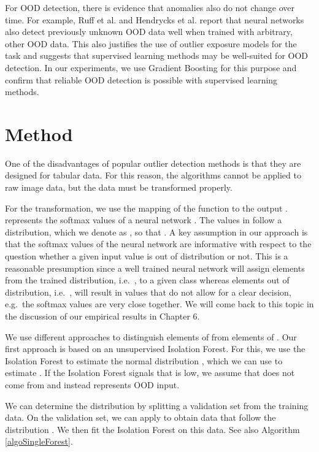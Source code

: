 \documentclass{article}
\begin{document}
For OOD detection, there is evidence that anomalies also do not change over time. For example, Ruff et al. \cite{Ruff.30.05.2020} and Hendrycks et al. \cite{Hendrycks.2018} report that neural networks also detect previously unknown OOD data well when trained with arbitrary, other OOD data. This also justifies the use of outlier exposure models for the task and suggests that supervised learning methods may be well-suited for OOD detection. In our experiments, we use Gradient Boosting \cite{Friedman.2002} for this purpose and confirm that reliable OOD detection is possible with supervised learning methods.


\section{Method}

One of the disadvantages of popular outlier detection methods is that they are designed for tabular data. For this reason, the algorithms cannot be applied to raw image data, but the data must be transformed properly.

For the transformation, we use the mapping of the function  to the output .  represents the softmax values of a neural network . The values in  follow a distribution, which we denote as , so that . A key assumption in our approach is that the softmax values of the neural network are informative with respect to the question whether a given input value is out of distribution or not. This is a reasonable presumption since a well trained neural network will assign elements from the trained distribution, i.e.~, to a given class whereas elements out of distribution, i.e.~, will result in values that do not allow for a clear decision, e.g.~the softmax values are very close together. We will come back to this topic in the discussion of our empirical results in Chapter 6.


We use different approaches to distinguish elements of  from elements of . Our first approach is based on an unsupervised Isolation Forest. For this, we use the Isolation Forest to estimate the normal distribution , which we can use to estimate . If the Isolation Forest signals that  is low, we assume that  does not come from  and instead represents OOD input.

We can determine the distribution  by splitting a validation set from the training data. On the validation set, we can apply  to obtain data that follow the distribution . We then fit the Isolation Forest on this data. See also Algorithm \ref{algoSingleForest}.
\end{document}
